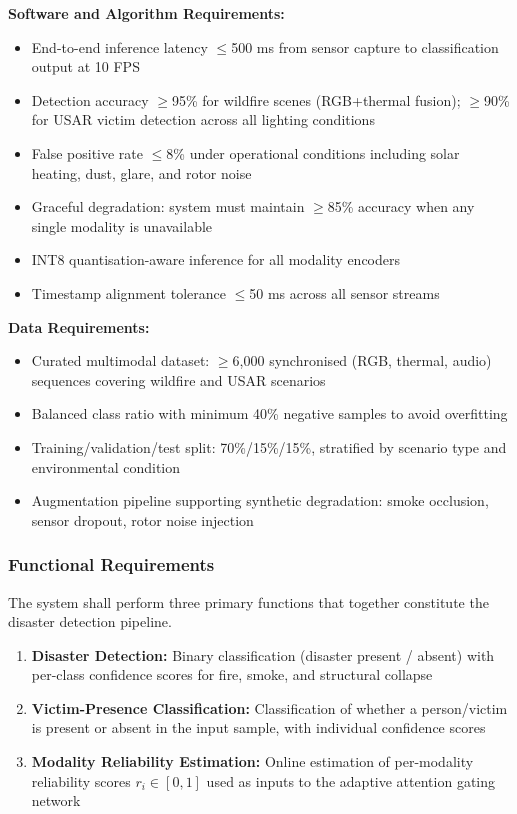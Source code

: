 \documentclass[journal]{IEEEtran}
\begin{document}
\textbf{Software and Algorithm Requirements:}
\begin{itemize}
    \item End-to-end inference latency $\leq$500 ms from sensor capture to classification output at 10 FPS
    \item Detection accuracy $\geq$95\% for wildfire scenes (RGB+thermal fusion); $\geq$90\% for USAR victim detection across all lighting conditions
    \item False positive rate $\leq$8\% under operational conditions including solar heating, dust, glare, and rotor noise
    \item Graceful degradation: system must maintain $\geq$85\% accuracy when any single modality is unavailable
    \item INT8 quantisation-aware inference for all modality encoders
    \item Timestamp alignment tolerance $\leq$50 ms across all sensor streams
\end{itemize}

\textbf{Data Requirements:}
\begin{itemize}
    \item Curated multimodal dataset: $\geq$6,000 synchronised (RGB, thermal, audio) sequences covering wildfire and USAR scenarios
    \item Balanced class ratio with minimum 40\% negative samples to avoid overfitting
    \item Training/validation/test split: 70\%/15\%/15\%, stratified by scenario type and environmental condition
    \item Augmentation pipeline supporting synthetic degradation: smoke occlusion, sensor dropout, rotor noise injection
\end{itemize}

\subsubsection{Functional Requirements}

The system shall perform three primary functions that together constitute the disaster detection pipeline.

\begin{enumerate}
    \item \textbf{Disaster Detection:} Binary classification (disaster present / absent) with per-class confidence scores for fire, smoke, and structural collapse
    \item \textbf{Victim-Presence Classification:} Classification of whether a person/victim is present or absent in the input sample, with individual confidence scores
    \item \textbf{Modality Reliability Estimation:} Online estimation of per-modality reliability scores $r_i \in [0,1]$ used as inputs to the adaptive attention gating network
\end{enumerate}
\end{document}
